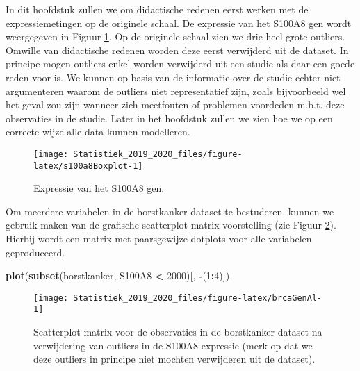 \documentclass[12pt,dutch,coursenotes]{book}
\newenvironment{Shaded}{\begin{snugshade}}{\end{snugshade}}
\newcommand{\KeywordTok}[1]{\textcolor[rgb]{0.13,0.29,0.53}{\textbf{#1}}}
\newcommand{\DataTypeTok}[1]{\textcolor[rgb]{0.13,0.29,0.53}{#1}}
\newcommand{\DecValTok}[1]{\textcolor[rgb]{0.00,0.00,0.81}{#1}}
\newcommand{\StringTok}[1]{\textcolor[rgb]{0.31,0.60,0.02}{#1}}
\newcommand{\OperatorTok}[1]{\textcolor[rgb]{0.81,0.36,0.00}{\textbf{#1}}}
\newcommand{\NormalTok}[1]{#1}
\theoremstyle{definition}
\theoremstyle{definition}
\theoremstyle{definition}
\theoremstyle{remark}
\begin{document}
In dit hoofdstuk zullen we om didactische redenen eerst werken met de
expressiemetingen op de originele schaal. De expressie van het S100A8
gen wordt weergegeven in Figuur \ref{fig:s100a8Boxplot}. Op de originele
schaal zien we drie heel grote outliers. Omwille van didactische redenen
worden deze eerst verwijderd uit de dataset. In principe mogen outliers
enkel worden verwijderd uit een studie als daar een goede reden voor is.
We kunnen op basis van de informatie over de studie echter niet
argumenteren waarom de outliers niet representatief zijn, zoals
bijvoorbeeld wel het geval zou zijn wanneer zich meetfouten of problemen
voordeden m.b.t. deze observaties in de studie. Later in het hoofdstuk
zullen we zien hoe we op een correcte wijze alle data kunnen modelleren.

\begin{Shaded}
\end{Shaded}

\begin{figure}

{\centering \texttt{[image: Statistiek\_2019\_2020\_files/figure-latex/s100a8Boxplot-1]} 

}

\caption{Expressie van het S100A8 gen.}\label{fig:s100a8Boxplot}
\end{figure}

Om meerdere variabelen in de borstkanker dataset te bestuderen, kunnen
we gebruik maken van de grafische scatterplot matrix voorstelling (zie
Figuur \ref{fig:brcaGenAl}). Hierbij wordt een matrix met paarsgewijze
dotplots voor alle variabelen geproduceerd.

\begin{Shaded}
\begin{Highlighting}[]
\KeywordTok{plot}\NormalTok{(}\KeywordTok{subset}\NormalTok{(borstkanker, S100A8 }\OperatorTok{<}\StringTok{ }\DecValTok{2000}\NormalTok{)[, }\OperatorTok{-}\NormalTok{(}\DecValTok{1}\OperatorTok{:}\DecValTok{4}\NormalTok{)])}
\end{Highlighting}
\end{Shaded}

\begin{figure}

{\centering \texttt{[image: Statistiek\_2019\_2020\_files/figure-latex/brcaGenAl-1]} 

}

\caption{Scatterplot matrix voor de observaties in de borstkanker dataset na verwijdering van outliers in de S100A8 expressie (merk op dat we deze outliers in principe niet mochten verwijderen uit de dataset).}\label{fig:brcaGenAl}
\end{figure}
\end{document}
